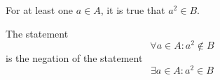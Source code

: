 \documentclass[main.tex]{subfiles}
\begin{document}
\subproblem{}\label{4b}
For at least one \(a \in A\), it is true that \(a^2 \in B\).

\begin{remark}
	The statement
	\[\forall a \in A: a^2 \notin B\]
	is the negation of the statement
	\[\exists a \in A: a^2 \in B\]
\end{remark}
\end{document}
